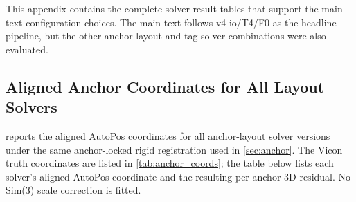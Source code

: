 \documentclass[11pt,a4paper]{article}
\begin{document}
This appendix contains the complete solver-result tables that support the main-text configuration choices.
The main text follows v4-io/T4/F0 as the headline pipeline, but the other anchor-layout and tag-solver combinations were also evaluated.

\subsection{Aligned Anchor Coordinates for All Layout Solvers}
\label{app:anchor_solver_coordinates}

 reports the aligned AutoPos coordinates for all anchor-layout solver versions under the same anchor-locked rigid registration used in \cref{sec:anchor}.
The Vicon truth coordinates are listed in \cref{tab:anchor_coords}; the table below lists each solver's aligned AutoPos coordinate and the resulting per-anchor 3D residual.
No Sim(3) scale correction is fitted.
\end{document}
